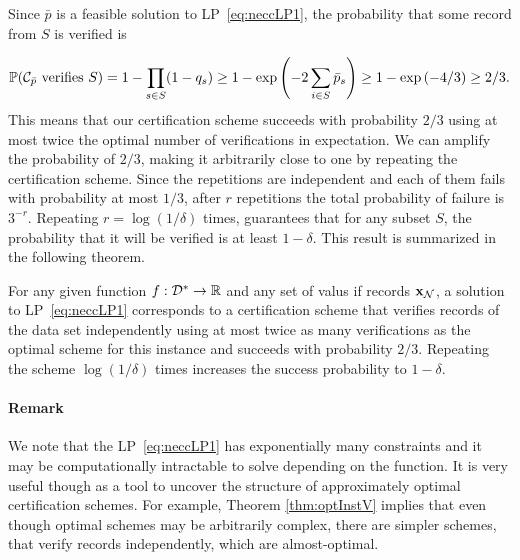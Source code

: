 \noindent Since $\bar{p}$ is a feasible solution to LP~\eqref{eq:neccLP1}, the probability that some record from $S$ is verified is

\[ \mathbb{P}(\text{$\mathcal{C}_{\bar{p}}$ verifies $S$}) = 1 - \prod_{s \in S} (1 - q_s) \ge 1 - \exp\left( - 2\sum_{i \in S} \bar{p}_s \right) \ge 1 - \exp\left( - 4/3 \right)\ge 2/3. \]
\noindent This means that our certification scheme succeeds with probability $2/3$ using at most twice the optimal number of
verifications in expectation. We can amplify the probability of $2/3$, making it arbitrarily close to one by repeating the
certification scheme. Since the repetitions are independent and each of them fails with probability at most $1/3$, after $r$
repetitions the total probability of failure is $3^{-r}$. Repeating $r = \log(1 / \delta)$ times, guarantees that for any
subset $S$, the probability that it will be verified is at least $1-\delta$. This result is summarized in the following theorem.


\begin{theorem} \label{thm:optInstV}
    For any given function $f : \mathcal{D}^* \to \mathbb{R}$ and any set of valus if records $\mathbf{x}_{\mathcal{N}}$, a solution to LP~\eqref{eq:neccLP1} corresponds to a
  certification scheme that verifies records of the data set independently using at most twice as many verifications as the optimal scheme for
  this instance and succeeds with probability $2/3$. Repeating the scheme $\log(1 / \delta)$ times increases the success probability to
  $1-\delta$.
\end{theorem}

\paragraph{Remark} We note that the LP~\eqref{eq:neccLP1} has exponentially many constraints and it may be computationally
intractable to solve depending on the function. It is very useful though as a tool to uncover the structure of approximately
optimal certification schemes. For example, Theorem \ref{thm:optInstV} implies that even though optimal schemes may be arbitrarily
complex, there are simpler schemes, that verify records independently, which are almost-optimal.
\medskip

